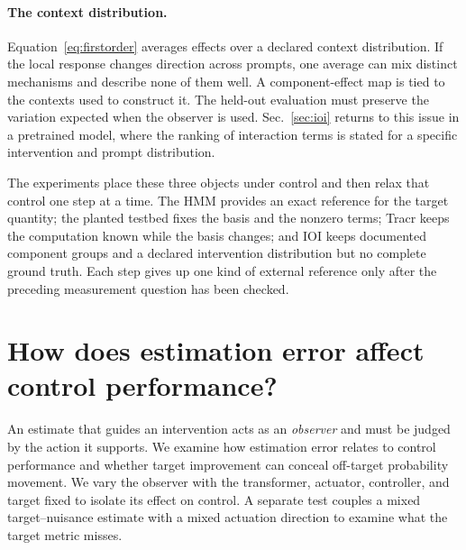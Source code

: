 \documentclass[sigconf,10pt,nonacm,balance=false]{acmart}
\begin{document}
\paragraph{The context distribution.}
Equation~\eqref{eq:firstorder} averages effects over a declared context distribution. If the local response changes direction across prompts, one average can mix distinct mechanisms and describe none of them well. A component-effect map is tied to the contexts used to construct it. The held-out evaluation must preserve the variation expected when the observer is used. Sec.~\ref{sec:ioi} returns to this issue in a pretrained model, where the ranking of interaction terms is stated for a specific intervention and prompt distribution.

The experiments place these three objects under control and then relax that control one step at a time. The HMM provides an exact reference for the target quantity; the planted testbed fixes the basis and the nonzero terms; Tracr keeps the computation known while the basis changes; and IOI keeps documented component groups and a declared intervention distribution but no complete ground truth. Each step gives up one kind of external reference only after the preceding measurement question has been checked.

\section{How does estimation error affect control performance?}\label{sec:control}

An estimate that guides an intervention acts as an \emph{observer} and must be judged by the action it supports. We examine how estimation error relates to control performance and whether target improvement can conceal off-target probability movement. We vary the observer with the transformer, actuator, controller, and target fixed to isolate its effect on control. A separate test couples a mixed target--nuisance estimate with a mixed actuation direction to examine what the target metric misses.
\end{document}
